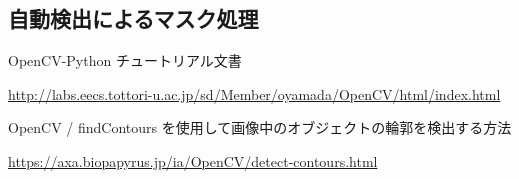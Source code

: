\documentclass[dvipdfmx]{jsarticle}
\begin{document}
\subsection{自動検出によるマスク処理}

\begin{thebibliography}{10}
   OpenCV-Python チュートリアル文書

  \url{http://labs.eecs.tottori-u.ac.jp/sd/Member/oyamada/OpenCV/html/index.html}

   OpenCV / findContours を使用して画像中のオブジェクトの輪郭を検出する方法

  \url{https://axa.biopapyrus.jp/ia/OpenCV/detect-contours.html}
\end{thebibliography}
\end{document}
